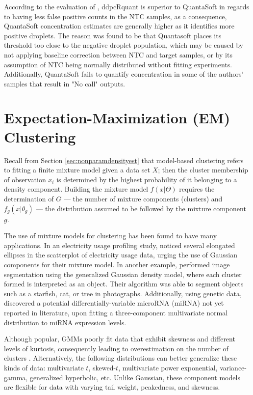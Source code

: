According to the evaluation of , ddpcRquant is superior to QuantaSoft in regards to having less false positive counts in the NTC samples, as a consequence, QuantaSoft concentration estimates are generally higher as it identifies more positive droplets. The reason was found to be that Quantasoft places its threshold too close to the negative droplet population, which may be caused by not applying baseline correction between NTC and target samples, or by its assumption of NTC being normally distributed without fitting experiments. Additionally, QuantaSoft fails to quantify concentration in some of the authors' samples that result in "No call" outputs.

\section{Expectation-Maximization (EM) Clustering}
\label{sec:emclustering}
Recall from Section \ref{sec:nonparamdensityest} that model-based clustering refers to fitting a finite mixture model given a data set \(X\); then the cluster membership of observation \(x_i\) is determined by the highest probability of it belonging to a density component. Building the mixture model \(f(x|\Theta)\) requires the determination of \(G\) — the number of mixture components (clusters) and \(f_g(x|\theta_g)\) — the distribution assumed to be followed by the mixture component \(g\). 

The use of mixture models for clustering has been found to have many applications. In an electricity usage profiling study,  noticed several elongated ellipses in the scatterplot of electricity usage data, urging the use of Gaussian components for their mixture model. In another example, \cite{Choy2017} performed image segmentation using the generalized Gaussian density model, where each cluster formed is interpreted as an object. Their algorithm was able to segment objects such as a starfish, cat, or tree in photographs. Additionally, using genetic data,  discovered a potential differentially-variable microRNA (miRNA) not yet reported in literature, upon fitting a three-component multivariate normal distribution to miRNA expression levels. 

Although popular, GMMs poorly fit data that exhibit skewness and different levels of kurtosis, consequently leading to overestimation on the number of clusters \cite{Dang2019}. Alternatively, the following distributions can better generalize these kinds of data: multivariate \(t\), skewed-\(t\), multivariate power exponential, variance-gamma, generalized hyperbolic, etc. Unlike Gaussian, these component models are flexible for data with varying tail weight, peakedness, and skewness.

